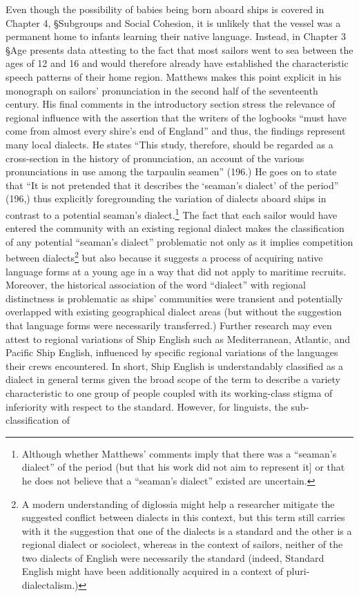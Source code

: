  Even though the possibility of babies being born aboard ships is covered in Chapter 4, §Subgroups and Social Cohesion, it is unlikely that the vessel was a permanent home to infants learning their native language. Instead, in Chapter 3 §Age presents data attesting to the fact that most sailors went to sea between the ages of 12 and 16 and would therefore already have established the characteristic speech patterns of their home region. Matthews makes this point explicit in his monograph on sailors’ pronunciation in the second half of the seventeenth century. His final comments in the introductory section stress the relevance of regional influence with the assertion that the writers of the logbooks “must have come from almost every shire’s end of England”  and thus, the findings represent many local dialects. He states “This study, therefore, should be regarded as a cross-section in the history of pronunciation, an account of the various pronunciations in use among the tarpaulin seamen” (196.) He goes on to state that “It is not pretended that it describes the ‘seaman’s dialect’ of the period” (196,) thus explicitly foregrounding the variation of dialects aboard ships in contrast to a potential seaman’s dialect.\footnote{Although whether Matthews’ comments imply that there was a “seaman’s dialect” of the period (but that his work did not aim to represent it] or that he does not believe that a “seaman’s dialect” existed are uncertain.}  The fact that each sailor would have entered the community with an existing regional dialect makes the classification of any potential “seaman’s dialect” problematic not only as it implies competition between dialects\footnote{A modern understanding of diglossia might help a researcher mitigate the suggested conflict between dialects in this context, but this term still carries with it the suggestion that one of the dialects is a standard and the other is a regional dialect or sociolect, whereas in the context of sailors, neither of the two dialects of English were necessarily the standard (indeed, Standard English might have been additionally acquired in a context of pluri-dialectalism.)}  but also because it suggests a process of acquiring native language forms at a young age in a way that did not apply to maritime recruits. Moreover, the historical association of the word “dialect” with regional distinctness is problematic as ships’ communities were transient and potentially overlapped with existing geographical dialect areas (but without the suggestion that language forms were necessarily transferred.) Further research may even attest to regional variations of Ship English such as Mediterranean, Atlantic, and Pacific Ship English, influenced by specific regional variations of the languages their crews encountered. In short, Ship English is understandably classified as a dialect in general terms given the broad scope of the term to describe a variety characteristic to one group of people coupled with its working-class stigma of inferiority with respect to the standard. However, for linguists, the sub-classification of 